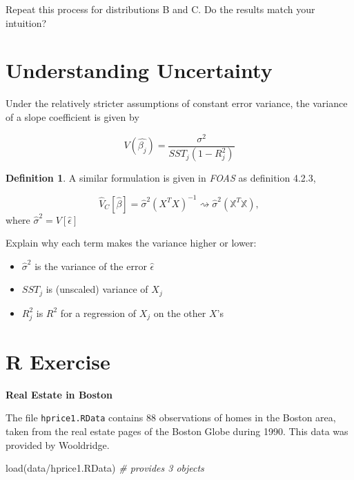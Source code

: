 \documentclass[
]{book}
\newenvironment{Shaded}{\begin{snugshade}}{\end{snugshade}}
\newcommand{\CommentTok}[1]{\textcolor[rgb]{0.56,0.35,0.01}{\textit{#1}}}
\newcommand{\FunctionTok}[1]{\textcolor[rgb]{0.00,0.00,0.00}{#1}}
\newcommand{\NormalTok}[1]{#1}
\newcommand{\StringTok}[1]{\textcolor[rgb]{0.31,0.60,0.02}{#1}}
\providecommand{\tightlist}{%
  \setlength{\itemsep}{0pt}\setlength{\parskip}{0pt}}
\theoremstyle{definition}
\newtheorem{definition}{Definition}[chapter]
\theoremstyle{definition}
\theoremstyle{definition}
\theoremstyle{definition}
\theoremstyle{remark}
\begin{document}
Repeat this process for distributions B and C. Do the results match your intuition?

\hypertarget{understanding-uncertainty-1}{%
\section{Understanding Uncertainty}\label{understanding-uncertainty-1}}

Under the relatively stricter assumptions of constant error variance, the variance of a slope coefficient is given by

\[
  V(\hat{\beta_j}) = \frac{\sigma^2}{SST_j (1-R_j^2)}
\]

\begin{definition}
A similar formulation is given in \emph{FOAS} as definition 4.2.3,

\[
  \hat{V}_{C}[\hat{\beta}] = \hat{\sigma}^2 \left( X^{T} X \right)^{-1} \rightsquigarrow \hat{\sigma}^{2}{\left(\mathbb{X}^{T}\mathbb{X}\right)}, 
\]
where \(\hat{\sigma}^{2} = V[\hat{\epsilon}]\)
\end{definition}

Explain why each term makes the variance higher or lower:

\begin{itemize}
\tightlist
\item
  \(\hat{\sigma}^2\) is the variance of the error \(\hat{\epsilon}\)
\item
  \(SST_j\) is (unscaled) variance of \(X_j\)
\item
  \(R_j^2\) is \(R^2\) for a regression of \(X_j\) on the other \(X\)'s
\end{itemize}

\hypertarget{r-exercise-1}{%
\section{R Exercise}\label{r-exercise-1}}

\textbf{Real Estate in Boston}

The file \texttt{hprice1.RData} contains 88 observations of homes in the Boston area, taken from the real estate pages of the Boston Globe during 1990. This data was provided by Wooldridge.

\begin{Shaded}
\begin{Highlighting}[]
\FunctionTok{load}\NormalTok{(}\StringTok{\textquotesingle{}data/hprice1.RData\textquotesingle{}}\NormalTok{) }\CommentTok{\# provides 3 objects }
\end{Highlighting}
\end{Shaded}
\end{document}
